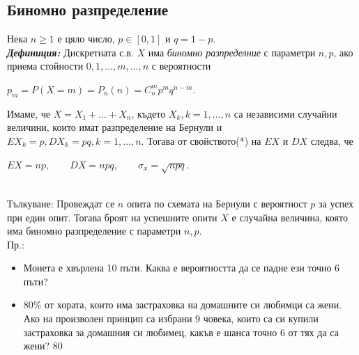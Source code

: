 \documentclass[11pt]{article} %
\newcommand{\italicBold}[1]{\textbf{\emph{#1}}}
\newcommand{\definition}{\italicBold{Дефиниция: }}
\begin{document}
\subsection{Биномно разпределение}
Нека $n \geq 1$ е цяло число, $p \in [0,1]$ и $q=1-p$.\\
\definition Дискретната с.в. $X$ има \textit{биномно разпределние} с параметри $n, p$, ако приема стойности $0,1,...,m,...,n$ с вероятности\\
\centerline{$p_{m}=P(X=m)=P_{n}(n)=C_{n}^{m}p^{m}q^{n-m}$.}
Имаме, че $X=X_{1}+...+X_{n}$, където $X_{k}, k=1,...,n$ са независими случайни величини, които имат разпределение на Бернули и $EX_{k}=p, DX_{k}=pq, k = 1,...,n$. Тогава от свойството(*) на $EX$ и $DX$ следва, че\\
\centerline{$EX=np, \qquad DX=npq, \qquad \sigma_{x}=\sqrt{npq}$.}
\\Тълкуване: Провеждат се $n$ опита по схемата на Бернули с вероятност $p$ за успех при един опит. Тогава броят на успешните опити $X$ е случайна величина, която има биномно разпределение с параметри $n, p$.\\
Пр.:
\begin{itemize}
	\item Монета е хвърлена 10 пъти. Каква е вероятността да се падне ези точно 6 пъти?\\
	\item 80\% от хората, които има застраховка на домашните си любимци са жени. Ако на произволен принцип са избрани 9 човека, които са си купили застраховка за домашния си любимец, какъв е шанса точно 6 от тях да са жени? 
	80%
\end{itemize}


 
\end{document}
